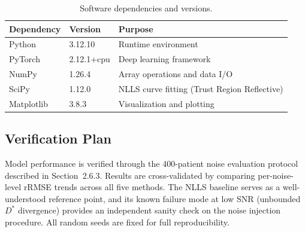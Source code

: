 \documentclass[12pt]{article}
\begin{document}
\begin{table}[h]
\centering
\caption{Software dependencies and versions.}
\label{tab:software}
\begin{tabular}{lll}
\toprule
\textbf{Dependency} & \textbf{Version} & \textbf{Purpose} \\
\midrule
Python     & 3.12.10    & Runtime environment \\
PyTorch    & 2.12.1+cpu & Deep learning framework \\
NumPy      & 1.26.4     & Array operations and data I/O \\
SciPy      & 1.12.0     & NLLS curve fitting (Trust Region Reflective) \\
Matplotlib & 3.8.3      & Visualization and plotting \\
\bottomrule
\end{tabular}
\end{table}

\subsection{Verification Plan}

Model performance is verified through the 400-patient noise evaluation protocol described in Section~2.6.3. Results are cross-validated by comparing per-noise-level rRMSE trends across all five methods. The NLLS baseline serves as a well-understood reference point, and its known failure mode at low SNR (unbounded $D^*$ divergence) provides an independent sanity check on the noise injection procedure. All random seeds are fixed for full reproducibility.
\end{document}
